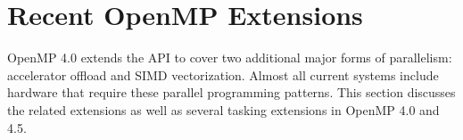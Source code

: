 \section{Recent OpenMP Extensions}
\label{sec:recent_extensions}

OpenMP 4.0 extends the API to cover two additional major forms of
parallelism: accelerator offload and SIMD vectorization. Almost all
current systems include hardware that require these parallel programming 
patterns. This section discusses the related extensions as well as several 
tasking extensions in OpenMP 4.0 and 4.5.






